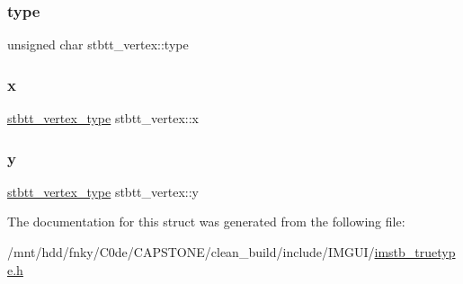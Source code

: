\subsubsection{\texorpdfstring{type}{type}}
{\footnotesize\ttfamily unsigned char stbtt\+\_\+vertex\+::type}

\mbox{\label{structstbtt__vertex_a81773edbe760d0e090561a3c1e86c919}} 
\subsubsection{\texorpdfstring{x}{x}}
{\footnotesize\ttfamily \hyperlink{imstb__truetype_8h_ab8fd8e5e0b82b0f7da54532035e47b22}{stbtt\+\_\+vertex\+\_\+type} stbtt\+\_\+vertex\+::x}

\mbox{\label{structstbtt__vertex_a9052065ca544b63d537325b246928cfc}} 
\subsubsection{\texorpdfstring{y}{y}}
{\footnotesize\ttfamily \hyperlink{imstb__truetype_8h_ab8fd8e5e0b82b0f7da54532035e47b22}{stbtt\+\_\+vertex\+\_\+type} stbtt\+\_\+vertex\+::y}



The documentation for this struct was generated from the following file\+:\begin{DoxyCompactItemize}
\item 
/mnt/hdd/fnky/\+C0de/\+C\+A\+P\+S\+T\+O\+N\+E/clean\+\_\+build/include/\+I\+M\+G\+U\+I/\hyperlink{imstb__truetype_8h}{imstb\+\_\+truetype.\+h}\end{DoxyCompactItemize}
